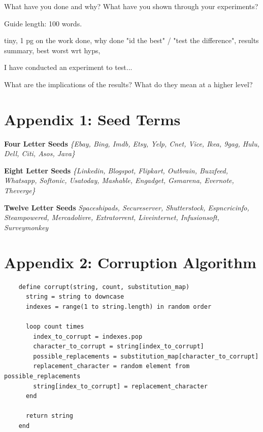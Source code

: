 \documentclass{csfourzero}
\begin{document}
What have you done and why? What have you shown through your
experiments?

Guide length: 100 words.

tiny, 1 pg on the work done, why done "id the best" / "test the difference", results summary, best worst wrt hyps,

I have conducted an experiment to test...

What are the implications of the results? What do they mean at a higher level?

\raggedbottom


\pagebreak
\raggedbottom
\section{Appendix 1: Seed Terms}
\textbf{Four Letter Seeds}
\textit{\{Ebay, Bing, Imdb, Etsy, Yelp, Cnet, Vice, Ikea, 9gag, Hulu, Dell, Citi, Asos, Java\}}

\noindent
\textbf{Eight Letter Seeds}
\textit{\{Linkedin, Blogspot, Flipkart, Outbrain, Buzzfeed, Whatsapp, Softonic, Usatoday, Mashable, Engadget, Gsmarena, Evernote, Theverge\}}

\noindent
\textbf{Twelve Letter Seeds}
\textit{{Spaceshipads, Secureserver, Shutterstock, Espncricinfo, Steampowered, Mercadolivre, Extratorrent, Liveinternet, Infusionsoft, Surveymonkey}}

\pagebreak
\raggedbottom
\section{Appendix 2: Corruption Algorithm}
  \begin{verbatim}
    define corrupt(string, count, substitution_map)
      string = string to downcase
      indexes = range(1 to string.length) in random order

      loop count times
        index_to_corrupt = indexes.pop
        character_to_corrupt = string[index_to_corrupt]
        possible_replacements = substitution_map[character_to_corrupt]
        replacement_character = random element from possible_replacements
        string[index_to_corrupt] = replacement_character
      end

      return string
    end
  \end{verbatim}

\pagebreak
\raggedbottom
\end{document}
